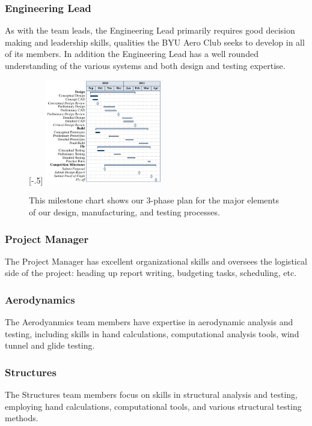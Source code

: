 \documentclass[proposal]{byu-aero}
\begin{document}
\subsubsection{Engineering Lead} As with the team leads, the Engineering Lead primarily requires good decision making and leadership skills, qualities the BYU Aero Club seeks to develop in all of its members.  In addition the Engineering Lead has a well rounded understanding of the various systems and both design and testing expertise.
\begin{figure}
	\centering
	\raisebox{0pt}[\dimexpr\height-.5\baselineskip\relax]{
	\includegraphics[width=0.45\textwidth]{ganttchart.pdf}}
	\caption{This milestone chart shows our 3-phase plan for the major elements of our design, manufacturing, and testing processes.}
	\label{fig:plannedtiming}
\end{figure}
\subsubsection{Project Manager} The Project Manager has excellent organizational skills  and oversees the logistical side of the project: heading up report writing, budgeting tasks, scheduling, etc.
\subsubsection{Aerodynamics} The Aerodyanmics team members have expertise in aerodynamic analysis and testing, including skills in hand calculations, computational analysis tools, wind tunnel and glide testing.
\subsubsection{Structures} The Structures team members focus on skills in structural analysis and testing, employing hand calculations, computational tools, and various structural testing methods.
\end{document}
